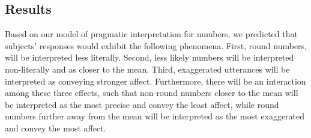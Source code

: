 \documentclass{article} %
\begin{document}
\subsection{Results}
Based on our model of pragmatic interpretation for numbers, we predicted that subjects' responses would exhibit the following phenomena. First, round numbers, will be interpreted less literally. Second, less likely numbers will be interpreted non-literally and as closer to the mean. Third, exaggerated utterances will be interpreted as conveying stronger affect. Furthermore, there will be an interaction among these three effects, such that non-round numbers closer to the mean will be interpreted as the most precise and convey the least affect, while round numbers further away from the mean will be interpreted as the most exaggerated and convey the most affect.


\end{document}
